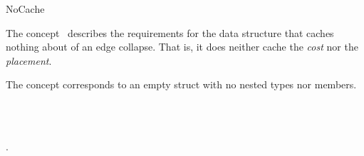 
\begin{ccRefConcept}{NoCache}


\ccDefinition

The concept \ccRefName\ describes the requirements for the data
structure that caches nothing about of an edge collapse. That is, it
does neither cache the {\em cost} nor the {\em placement}.

The concept corresponds to an empty struct with no nested types nor members.

\ccRefines
{}\\
\\

\ccHasModels

.

\end{ccRefConcept}

